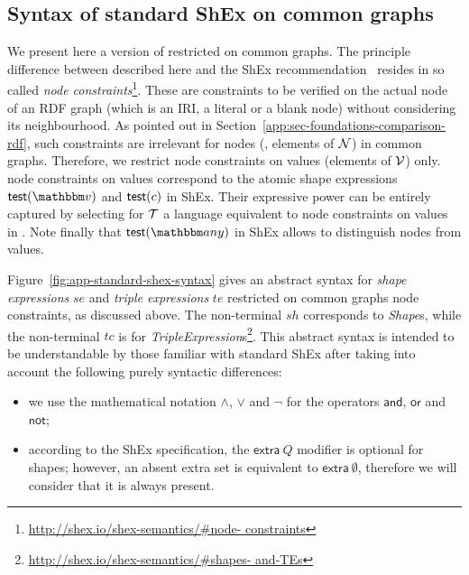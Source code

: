 \subsection{Syntax of standard ShEx on common graphs}
\label{app:sec-shex-standard-shex-on-common-graphs}

We present here a version of \stshex restricted on common graphs.
The principle difference between \stshex described here and the ShEx
recommendation~\cite{PBGK19} resides in so called \emph{node
constraints}\footnote{\url{http://shex.io/shex-semantics/\#node- constraints}}.
These are constraints to be verified on the actual node of an RDF graph (which
is an IRI, a literal or a blank node) without considering its neighbourhood.
As pointed out in Section~\ref{app:sec-foundations-comparison-rdf}, such
constraints are irrelevant for nodes (\ie, elements of $\mathcal{N}$) in common
graphs.
Therefore, we restrict \stshex node constraints on values (elements of
$\mathcal{V}$) only.
\stshex node constraints on values correspond to the atomic shape expressions
$\shextest(\vtype)$ and $\mathsf{test}(c)$ in ShEx.
Their expressive power can be entirely captured by selecting for $\mathcal{T}$ a
language equivalent to node constraints on values in \stshex.
Note finally that $\shextest(\any)$ in ShEx allows to distinguish nodes from
values.

\newcommand{\stse}{\mathit{se}}
\newcommand{\stte}{\mathit{te}}
\newcommand{\stclosed}{\mathsf{closed}}
\newcommand{\stextra}{\mathsf{extra}}
\newcommand{\stshape}{\mathit{sh}}
\newcommand{\sttc}{\mathit{tc}}
\newcommand{\stcard}{\mathit{card}}
\newcommand{\normalised}[1]{\tilde{#1}}
\newcommand{\trtefromst}[1]{\tau_{\text{e}}(#1)}
\newcommand{\trfromst}[1]{\tau(#1)}
\newcommand{\trtetost}[1]{\sigma_{\text{e}}(#1)}
\newcommand{\trtost}[1]{\sigma(#1)}
\newcommand{\stses}[2]{\mathit{SE}_{#2}(#1)}
\newcommand{\stextraconstr}[2]{\eta^{#2}_{#1}}
\newcommand{\preds}{\mathit{preds}}

Figure~\ref{fig:app-standard-shex-syntax} gives an abstract syntax for \stshex
\emph{shape expressions} $\stse$ and \emph{triple expressions} $\stte$
restricted on common graphs \wrt node constraints, as discussed above.
The non-terminal $\mathit{sh}$ corresponds to \emph{Shape}s, while the
non-terminal $\mathit{tc}$ is for
\emph{TripleExpression}s\footnote{\url{http://shex.io/shex-semantics/\#shapes-
and-TEs}}.
This abstract syntax is intended to be understandable by those familiar with
standard ShEx after taking into account the following purely syntactic
differences:
\begin{itemize}
\item
  we use the mathematical notation $\land$, $\lor$ and $\neg$ for the
  \stshex operators $\mathsf{and}$, $\mathsf{or}$ and $\mathsf{not}$;
\item
  according to the ShEx specification, the $\stextra\ Q$ modifier is optional
  for shapes; however, an absent extra set is equivalent to $\stextra \
  \emptyset$, therefore we will consider that it is always present.
\end{itemize}

